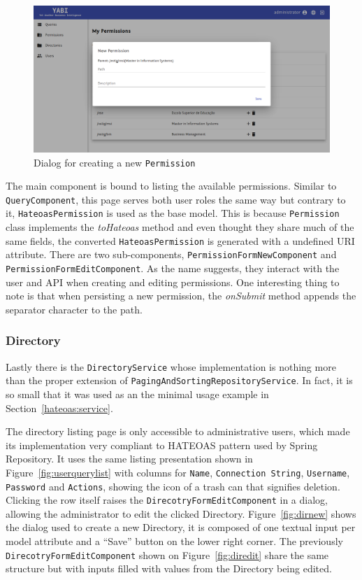 \begin{figure}
  \centering
  \includegraphics[width=.8\textwidth]{images/screenshots/permission/permission-new}
  \caption{Dialog for creating a new \texttt{Permission}}\label{fig:permissionnew}
\end{figure}

The main component is bound to listing the available permissions. Similar to \texttt{QueryComponent}, this page serves both user roles the same way but contrary to it, \texttt{HateoasPermission} is used as the base model. This is because \texttt{Permission} class implements the \textit{toHateoas} method and even thought they share much of the same fields, the converted \texttt{HateoasPermission} is generated with a undefined \gls{URI} attribute. There are two sub-components, \texttt{PermissionFormNewComponent} and \texttt{PermissionFormEditComponent}. As the name suggests, they interact with the user and \gls{API} when creating and editing permissions. One interesting thing to note is that when persisting a new permission, the \textit{onSubmit} method appends the separator character to the path.

\subsubsection{Directory}
Lastly there is the \texttt{DirectoryService} whose implementation is nothing more than the proper extension of \texttt{PagingAndSortingRepositoryService}. In fact, it is so small that it was used as an the minimal usage example in Section~\ref{hateoas:service}.

The directory listing page is only accessible to administrative users, which made its implementation very compliant to  \gls{HATEOAS} pattern used by Spring Repository. It uses the same listing presentation shown in Figure~\ref{fig:userquerylist} with columns for \texttt{Name}, \texttt{Connection String}, \texttt{Username}, \texttt{Password} and \texttt{Actions}, showing the icon of a trash can that signifies deletion. Clicking the row itself raises the \texttt{DirecotryFormEditComponent} in a dialog, allowing the administrator to edit the clicked Directory.
Figure~\ref{fig:dirnew} shows the dialog used to create a new Directory, it is composed of one textual input per model attribute and a ``Save'' button on the lower right corner. The previously \texttt{DirecotryFormEditComponent} shown on Figure~\ref{fig:diredit} share the same structure but with inputs filled with values from the Directory being edited.

